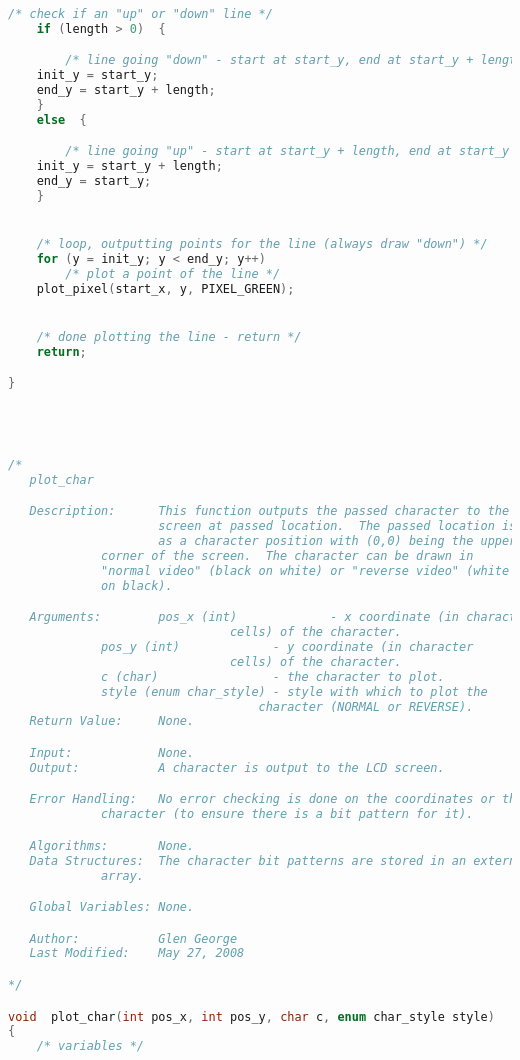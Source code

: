 \begin{lstlisting}[language=C]
    /* check if an "up" or "down" line */
    if (length > 0)  {

        /* line going "down" - start at start_y, end at start_y + length */
	init_y = start_y;
	end_y = start_y + length;
    }
    else  {

        /* line going "up" - start at start_y + length, end at start_y */
	init_y = start_y + length;
	end_y = start_y;
    }


    /* loop, outputting points for the line (always draw "down") */
    for (y = init_y; y < end_y; y++)
        /* plot a point of the line */
	plot_pixel(start_x, y, PIXEL_GREEN);


    /* done plotting the line - return */
    return;

}




/*
   plot_char

   Description:      This function outputs the passed character to the LCD
                     screen at passed location.  The passed location is given
                     as a character position with (0,0) being the upper left
		     corner of the screen.  The character can be drawn in
		     "normal video" (black on white) or "reverse video" (white
		     on black).

   Arguments:        pos_x (int)             - x coordinate (in character
   				               cells) of the character.
		     pos_y (int)             - y coordinate (in character
   				               cells) of the character.
		     c (char)                - the character to plot.
		     style (enum char_style) - style with which to plot the
		     		               character (NORMAL or REVERSE).
   Return Value:     None.

   Input:            None.
   Output:           A character is output to the LCD screen.

   Error Handling:   No error checking is done on the coordinates or the
   		     character (to ensure there is a bit pattern for it).

   Algorithms:       None.
   Data Structures:  The character bit patterns are stored in an external
   		     array.

   Global Variables: None.

   Author:           Glen George
   Last Modified:    May 27, 2008

*/

void  plot_char(int pos_x, int pos_y, char c, enum char_style style)
{
    /* variables */


\end{lstlisting}
